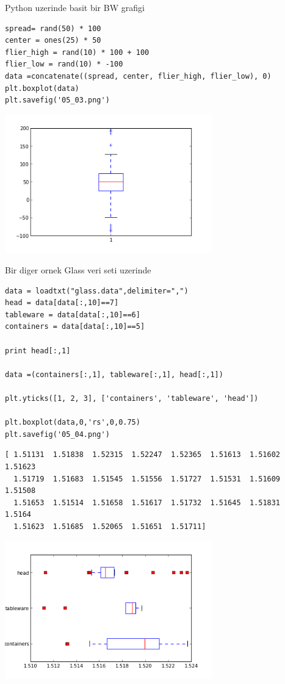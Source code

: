 \documentclass[12pt,fleqn]{article}\usepackage{../common}
\begin{document}
Python uzerinde basit bir BW grafigi 

\begin{verbatim}
spread= rand(50) * 100
center = ones(25) * 50
flier_high = rand(10) * 100 + 100
flier_low = rand(10) * -100
data =concatenate((spread, center, flier_high, flier_low), 0)
plt.boxplot(data)
plt.savefig('05_03.png')
\end{verbatim}

\includegraphics[height=6cm]{05_03.png}

Bir diger ornek Glass veri seti uzerinde

\begin{verbatim}
data = loadtxt("glass.data",delimiter=",")
head = data[data[:,10]==7]
tableware = data[data[:,10]==6]
containers = data[data[:,10]==5]

print head[:,1]

data =(containers[:,1], tableware[:,1], head[:,1])

plt.yticks([1, 2, 3], ['containers', 'tableware', 'head'])

plt.boxplot(data,0,'rs',0,0.75)
plt.savefig('05_04.png')
\end{verbatim}

\begin{verbatim}
[ 1.51131  1.51838  1.52315  1.52247  1.52365  1.51613  1.51602  1.51623
  1.51719  1.51683  1.51545  1.51556  1.51727  1.51531  1.51609  1.51508
  1.51653  1.51514  1.51658  1.51617  1.51732  1.51645  1.51831  1.5164
  1.51623  1.51685  1.52065  1.51651  1.51711]
\end{verbatim}

\includegraphics[height=6cm]{05_04.png}
\end{document}
